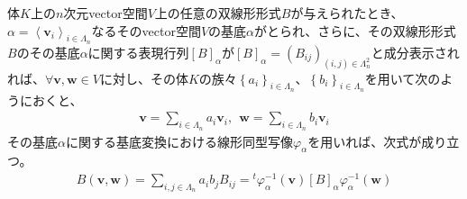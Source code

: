 \documentclass[dvipdfmx]{jsarticle}
\begin{document}
\begin{thm}\label{2.3.4.8}
体$K$上の$n$次元vector空間$V$上の任意の双線形形式$B$が与えられたとき、$\alpha = \left\langle \mathbf{v}_{i} \right\rangle_{i \in \varLambda_{n}}$なるそのvector空間$V$の基底$\alpha$がとられ、さらに、その双線形形式$B$のその基底$\alpha$に関する表現行列$[ B]_{\alpha}$が$[ B]_{\alpha} = \left( B_{ij} \right)_{(i,j) \in \varLambda_{n}^{2}}$と成分表示されれば、$\forall\mathbf{v},\mathbf{w} \in V$に対し、その体$K$の族々$\left\{ a_{i} \right\}_{i \in \varLambda_{n}}$、$\left\{ b_{i} \right\}_{i \in \varLambda_{n}}$を用いて次のようにおくと、
\begin{align*}
\mathbf{v} = \sum_{i \in \varLambda_{n}} {a_{i}\mathbf{v}_{i}},\ \ \mathbf{w} = \sum_{i \in \varLambda_{n}} {b_{i}\mathbf{v}_{i}}
\end{align*}
その基底$\alpha$に関する基底変換における線形同型写像$\varphi_{\alpha}$を用いれば、次式が成り立つ。
\begin{align*}
B\left( \mathbf{v},\mathbf{w} \right) = \sum_{i,j \in \varLambda_{n}} {a_{i}b_{j}B_{ij}} ={}^{t}\varphi_{\alpha}^{- 1}\left( \mathbf{v} \right)[ B]_{\alpha}\varphi_{\alpha}^{- 1}\left( \mathbf{w} \right)
\end{align*}
\end{thm}
\end{document}
